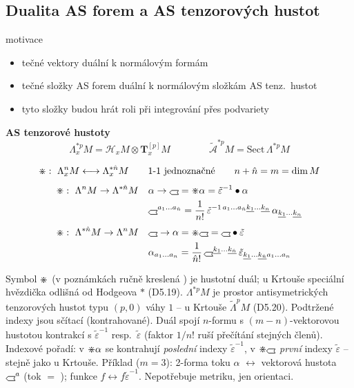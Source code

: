 
\subsection{Dualita AS forem a AS tenzorových hustot}

motivace
\begin{itemize}[nosep]
  \item[] tečné vektory duální k normálovým formám
  \item[] tečné složky AS forem duální k normálovým složkám AS tenz.\ hustot
  \item[] tyto složky budou hrát roli při integrování přes podvariety
\end{itemize}

\textbf{AS tenzorové hustoty}
\[
  \Lambda^{*p}_xM = \mathcal{H}_xM\otimes\mathbf{T}^{[p]}_xM \qquad\qquad \tilde{\mathcal{A}}^{*p}M = \mathrm{Sect}\,\Lambda^{*p}M
\]

\begin{definice}
\[
  \mathord{\divideontimes}:\ \Lambda^n_xM \longleftrightarrow \Lambda^{*\hat n}_xM \qquad\text{1-1 jednoznačné} \qquad n + \hat n = m = \dim M
\]
\begin{align*}
  \gmIhdual:\ \Lambda^nM\to\Lambda^{*\hat n}M \quad& \alpha\to\gmIhustsym = \gmIhdual\alpha = \tilde\varepsilon^{-1}\bullet\alpha \\
  & \gmIhustsym^{a_1\dots a_{\hat n}} = \frac{1}{n!}\,\tilde\varepsilon^{-1\,a_1\dots a_{\hat n}\underline{k_1}\dots\underline{k_n}}\,\alpha_{\underline{k_1}\dots\underline{k_n}} \\[3pt]
  \gmIhdual:\ \Lambda^{*\hat n}M\to\Lambda^nM \quad& \gmIhustsym\to\alpha = \gmIhdual\gmIhustsym = \gmIhustsym\bullet\tilde\varepsilon \\
  & \alpha_{a_1\dots a_n} = \frac{1}{\hat n!}\,\gmIhustsym^{\underline{k_1}\dots\underline{k_{\hat n}}}\,\tilde\varepsilon_{\underline{k_1}\dots\underline{k_{\hat n}}a_1\dots a_n}
\end{align*}
\end{definice}

\begin{vysvetleni}
Symbol $\mathord{\divideontimes}$ (v poznámkách ručně kreslená ) je hustotní duál; u Krtouše speciální hvězdička odlišná
od Hodgeova $*$ (D5.19). $\Lambda^{*p}M$ je prostor antisymetrických tenzorových hustot typu $(p,0)$ váhy $1$ -- u Krtouše $\tilde\Lambda^pM$ (D5.20).
Podtržené indexy jsou sčítací (kontrahované). Duál spojí $n$-formu s $(m-n)$-vektorovou hustotou kontrakcí s $\tilde\varepsilon^{-1}$ resp.\ $\tilde\varepsilon$
(faktor $1/n!$ ruší přečítání stejných členů). Indexové pořadí: v $\mathord{\divideontimes}\alpha$ se kontrahují \emph{poslední} indexy $\tilde\varepsilon^{-1}$,
v $\gmIhdual\gmIhustsym$ \emph{první} indexy $\tilde\varepsilon$ -- stejně jako u Krtouše.
Příklad ($m=3$): 2-forma toku $\alpha$ $\leftrightarrow$ vektorová hustota $\gmIhustsym^a$ (tok $=$ ); funkce $f\leftrightarrow f\tilde\varepsilon^{-1}$.
Nepotřebuje metriku, jen orientaci.
\end{vysvetleni}

